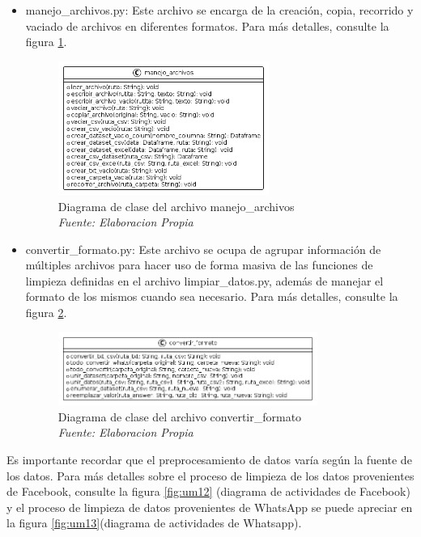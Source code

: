 \begin{itemize}

\item manejo\_archivos.py: Este archivo se encarga de la creación, copia, recorrido y vaciado de archivos en diferentes formatos. Para más detalles, consulte la figura \ref{fig:uml3}.

\begin{figure}[h!]
	\includegraphics[width=0.65\textwidth]{capitulo5/figuras/fig3.png}
	\caption{Diagrama de clase del archivo manejo\_archivos
		\\\textit{Fuente: Elaboracion Propia}}
	\label{fig:uml3}
\end{figure}


\item convertir\_formato.py: Este archivo se ocupa de agrupar información de múltiples archivos para hacer uso de forma masiva de las funciones de limpieza definidas en el archivo limpiar\_datos.py, además de manejar el formato de los mismos cuando sea necesario. Para más detalles, consulte la figura \ref{fig:uml4}.

\begin{figure}[h!]
	\includegraphics[width=0.8\textwidth]{capitulo5/figuras/fig4.png}
	\caption{Diagrama de clase del archivo convertir\_formato
		\\\textit{Fuente: Elaboracion Propia}}
	\label{fig:uml4}
\end{figure}

\end{itemize}

Es importante recordar que el preprocesamiento de datos varía según la fuente de los datos. Para más detalles sobre el proceso de limpieza de los datos provenientes de Facebook, consulte la figura \ref{fig:um12} (diagrama de actividades de Facebook) y el proceso de limpieza de datos provenientes de WhatsApp se puede apreciar en la figura \ref{fig:um13}(diagrama de actividades de Whatsapp).

